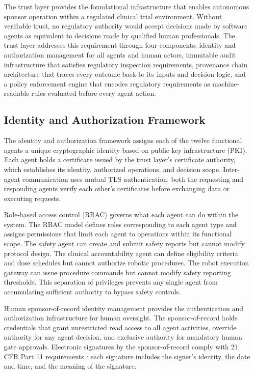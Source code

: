
The trust layer provides the foundational infrastructure that enables autonomous sponsor
operation within a regulated clinical trial environment. Without verifiable trust, no
regulatory authority would accept decisions made by software agents as equivalent to
decisions made by qualified human professionals. The trust layer addresses this requirement
through four components: identity and authorization management for all agents and human
actors, immutable audit infrastructure that satisfies regulatory inspection requirements,
provenance chain architecture that traces every outcome back to its inputs and decision
logic, and a policy enforcement engine that encodes regulatory requirements as
machine-readable rules evaluated before every agent action.

\subsection{Identity and Authorization Framework}

The identity and authorization framework assigns each of the twelve functional agents a
unique cryptographic identity based on public key infrastructure (PKI). Each agent holds a
certificate issued by the trust layer's certificate authority, which establishes its identity,
authorized operations, and decision scope. Inter-agent communication uses mutual TLS
authentication: both the requesting and responding agents verify each other's certificates
before exchanging data or executing requests.

Role-based access control (RBAC) governs what each agent can do within the system. The RBAC
model defines roles corresponding to each agent type and assigns permissions that limit
each agent to operations within its functional scope. The safety agent can create and
submit safety reports but cannot modify protocol design. The clinical accountability agent
can define eligibility criteria and dose schedules but cannot authorize robotic procedures.
The robot execution gateway can issue procedure commands but cannot modify safety reporting
thresholds. This separation of privileges prevents any single agent from accumulating
sufficient authority to bypass safety controls.

Human sponsor-of-record identity management provides the authentication and authorization
infrastructure for human oversight. The sponsor-of-record holds credentials that grant
unrestricted read access to all agent activities, override authority for any agent decision,
and exclusive authority for mandatory human gate approvals. Electronic signatures by the
sponsor-of-record comply with 21 CFR Part 11 requirements \cite{cfr-part-11}: each signature
includes the signer's identity, the date and time, and the meaning of the signature.

